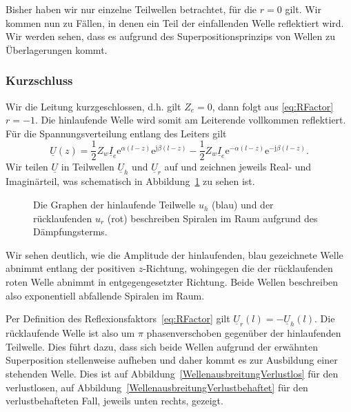 \documentclass[paper=a4, parskip=half-, ngerman, fontsize=11pt]{scrreprt}
\begin{document}
Bisher haben wir nur einzelne Teilwellen betrachtet, für die $r = 0$ gilt. Wir kommen nun zu Fällen, in denen ein Teil
der einfallenden Welle reflektiert wird. Wir werden sehen, dass es aufgrund des Superpositionsprinzips von Wellen zu
Überlagerungen kommt.


\subsubsection{Kurzschluss}
Wir die Leitung kurzgeschlossen, d.h. gilt $Z_{e} = 0$, dann folgt aus \eqref{eq:RFactor} $r=-1$. Die hinlaufende Welle
wird somit am Leiterende vollkommen reflektiert. Für die Spannungsverteilung entlang des Leiters gilt
\begin{equation}
\underline{U}(z) =
\frac{1}{2} Z_{w} \underline{I}_{e}
\mathrm{e}^{\alpha (l - z)}
\mathrm{e}^{\mathrm{j} \beta (l - z)}
-
\frac{1}{2} Z_{w} \underline{I}_{e}
\mathrm{e}^{- \alpha (l - z)}
\mathrm{e}^{- \mathrm{j} \beta (l - z)} \label{eq:UKurzschluss}.
\end{equation}
Wir teilen $\underline{U}$ in Teilwellen $\underline{U}_{h}$ und $\underline{U}_{r}$ auf und zeichnen jeweils Real-
und Imaginärteil, was schematisch in Abbildung~\ref{ImaginaerWelle} zu sehen ist.
\begin{figure}[ht]
    \begin{center}
        
        \caption{Die Graphen der hinlaufende Teilwelle $u_{h}$ (blau) und der rücklaufenden $u_{r}$ (rot) beschreiben
        Spiralen im Raum aufgrund des Dämpfungsterms.}
        \label{ImaginaerWelle}
    \end{center}
\end{figure}
Wir sehen deutlich, wie die Amplitude der hinlaufenden, blau gezeichnete Welle abnimmt entlang der positiven
$z$-Richtung, wohingegen die der rücklaufenden roten Welle abnimmt in entgegengesetzter Richtung. Beide Wellen
beschreiben also exponentiell abfallende Spiralen im Raum.

Per Definition des Reflexionsfaktors~\eqref{eq:RFactor} gilt $\underline{U}_{r}(l) = - \underline{U}_{h}(l)$. Die
rücklaufende Welle ist also um $\pi$ phasenverschoben gegenüber der hinlaufenden Teilwelle. Dies führt dazu, dass sich
beide Wellen aufgrund der erwähnten Superposition stellenweise aufheben und daher kommt es zur Ausbildung einer
stehenden Welle. Dies ist auf Abbildung~\ref{WellenausbreitungVerlustlos} für den verlustlosen, auf
Abbildung~\ref{WellenausbreitungVerlustbehaftet} für den verlustbehafteten Fall, jeweils unten rechts, gezeigt.
\end{document}
